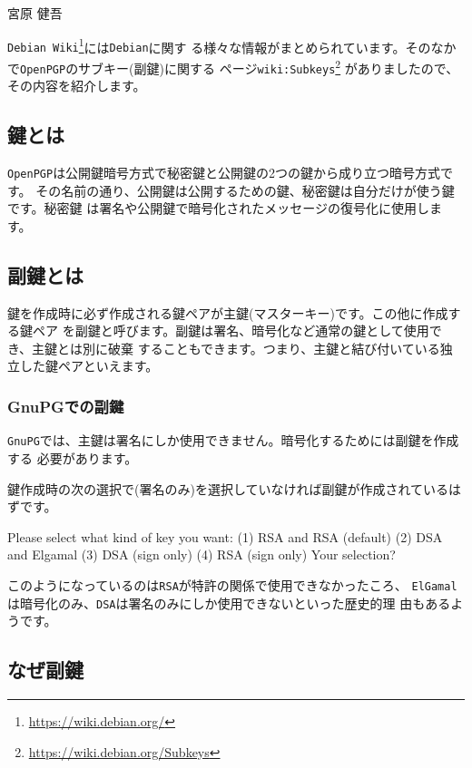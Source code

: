 \documentclass[mingoth,a4paper]{jsarticle}
\begin{document}
\begin{prework}{ 宮原 健吾 }
\end{prework}

\clearpage
{}

{\tt Debian Wiki}\footnote{\url{https://wiki.debian.org/}}には{\tt Debian}に関す
る様々な情報がまとめられています。そのなかで{\tt OpenPGP}のサブキー(副鍵)に関する
ページ{\tt wiki:Subkeys}\footnote{\url{https://wiki.debian.org/Subkeys}}
がありましたので、その内容を紹介します。

\subsection{鍵とは}

{\tt OpenPGP}は公開鍵暗号方式で秘密鍵と公開鍵の2つの鍵から成り立つ暗号方式です。
その名前の通り、公開鍵は公開するための鍵、秘密鍵は自分だけが使う鍵です。秘密鍵
は署名や公開鍵で暗号化されたメッセージの復号化に使用します。

\subsection{副鍵とは}

鍵を作成時に必ず作成される鍵ペアが主鍵(マスターキー)です。この他に作成する鍵ペア
を副鍵と呼びます。副鍵は署名、暗号化など通常の鍵として使用でき、主鍵とは別に破棄
することもできます。つまり、主鍵と結び付いている独立した鍵ペアといえます。

\subsubsection{GnuPGでの副鍵}

{\tt GnuPG}では、主鍵は署名にしか使用できません。暗号化するためには副鍵を作成する
必要があります。

鍵作成時の次の選択で(署名のみ)を選択していなければ副鍵が作成されているはずです。

\begin{commandline}
Please select what kind of key you want:
   (1) RSA and RSA (default)
   (2) DSA and Elgamal
   (3) DSA (sign only)
   (4) RSA (sign only)
Your selection?
\end{commandline}

このようになっているのは{\tt RSA}が特許の関係で使用できなかったころ、
{\tt ElGamal}は暗号化のみ、{\tt DSA}は署名のみにしか使用できないといった歴史的理
由もあるようです。


\subsection{なぜ副鍵}
\end{document}
